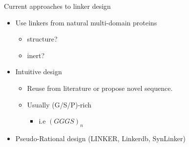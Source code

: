 \documentclass{beamer}
\begin{document}
\begin{frame}{Current approaches to linker design}


\begin{itemize}

\item Use linkers from natural multi-domain proteins
 \begin{itemize}
  \item structure?
  \item inert?
 \end{itemize}

\item Intuitive design
 \begin{itemize}
  \item Reuse from literature or propose novel sequence. 
  \item Usually (G/S/P)-rich 
  \begin{itemize}
   \item  i.e $(GGGS)_n$ 
  \end{itemize}
    \end{itemize}

 \item Pseudo-Rational design (LINKER, Linkerdb, SynLinker)



\end{itemize}
\end{frame}











\end{document}
